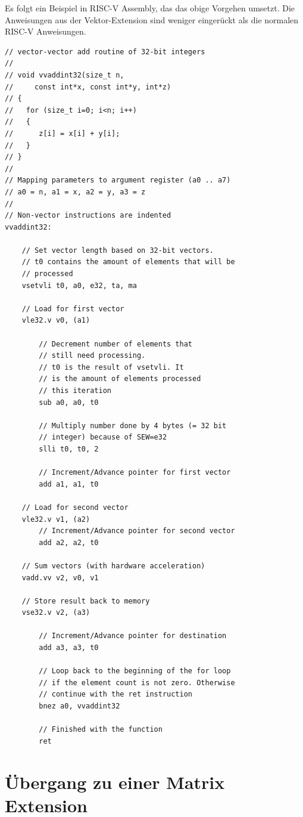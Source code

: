 Es folgt ein Beispiel in RISC-V Assembly, das das obige Vorgehen umsetzt. Die Anweisungen aus der Vektor-Extension sind weniger eingerückt als die normalen RISC-V Anweisungen.


\begin{lstlisting}[style=PseudoLang,caption={Vektoraddition Strip-Mining},captionpos=b]
// vector-vector add routine of 32-bit integers
//
// void vvaddint32(size_t n,
//     const int*x, const int*y, int*z)
// {
//	 for (size_t i=0; i<n; i++)
//   {
//      z[i] = x[i] + y[i];
//   }
// }
//
// Mapping parameters to argument register (a0 .. a7)
// a0 = n, a1 = x, a2 = y, a3 = z
//
// Non-vector instructions are indented
vvaddint32:

    // Set vector length based on 32-bit vectors.
    // t0 contains the amount of elements that will be
    // processed
	vsetvli t0, a0, e32, ta, ma

    // Load for first vector
	vle32.v v0, (a1)

        // Decrement number of elements that
        // still need processing.
        // t0 is the result of vsetvli. It
        // is the amount of elements processed
        // this iteration
		sub a0, a0, t0

        // Multiply number done by 4 bytes (= 32 bit
        // integer) because of SEW=e32
		slli t0, t0, 2

        // Increment/Advance pointer for first vector
		add a1, a1, t0

    // Load for second vector
	vle32.v v1, (a2)
        // Increment/Advance pointer for second vector
		add a2, a2, t0

    // Sum vectors (with hardware acceleration)
	vadd.vv v2, v0, v1

    // Store result back to memory
	vse32.v v2, (a3)

        // Increment/Advance pointer for destination
		add a3, a3, t0

        // Loop back to the beginning of the for loop
        // if the element count is not zero. Otherwise
        // continue with the ret instruction
		bnez a0, vvaddint32

        // Finished with the function
		ret
\end{lstlisting}

\section{Übergang zu einer Matrix Extension} \label{sec:riscv_matrix_extension}

